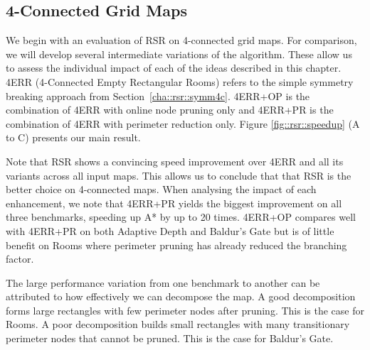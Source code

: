 

\subsection{4-Connected Grid Maps}
We begin with an evaluation of RSR on 4-connected grid maps. 
For comparison, we will develop several intermediate variations
of the algorithm. These allow us to assess the individual impact
of each of the ideas described in this chapter.
4ERR (4-Connected Empty Rectangular Rooms) refers to the simple
symmetry breaking approach from Section~\ref{cha::rsr::symm4c}.
4ERR+OP is the combination of 4ERR with online node pruning only and 
4ERR+PR is the combination of 4ERR with perimeter reduction only.
Figure \ref{fig::rsr::speedup} (A to C) presents our main result.
\par
Note that RSR shows a convincing 
speed improvement over 4ERR and all its variants across all input maps.
This allows us to conclude that that RSR is the better choice on 4-connected maps.
When analysing the impact of each enhancement, we note that 4ERR+PR yields the
biggest improvement on all three benchmarks, speeding up A* by up to 20 times.
4ERR+OP compares well with 4ERR+PR on both Adaptive Depth and
Baldur's Gate but is of little benefit on Rooms where perimeter pruning has
already reduced the branching factor.
\par
The large performance variation from one benchmark to another can be attributed
to how effectively we can decompose the map. A good decomposition forms large
rectangles with few perimeter nodes after pruning. This is the case for Rooms.
A poor decomposition builds small rectangles with many transitionary perimeter 
nodes that cannot be pruned. This is the case for Baldur's Gate. 

